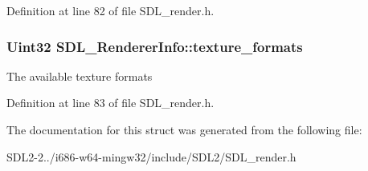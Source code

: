 Definition at line 82 of file S\+D\+L\+\_\+render.\+h.

\hypertarget{structSDL__RendererInfo_a16b63b945662da26d2280458bb2bfa01}{
\subsubsection[{texture\+\_\+formats}]{\setlength{\rightskip}{0pt plus 5cm}Uint32 S\+D\+L\+\_\+\+Renderer\+Info\+::texture\+\_\+formats}}\label{structSDL__RendererInfo_a16b63b945662da26d2280458bb2bfa01}
The available texture formats 

Definition at line 83 of file S\+D\+L\+\_\+render.\+h.



The documentation for this struct was generated from the following file\+:\begin{DoxyCompactItemize}
\item 
S\+D\+L2-\/2../i686-\/w64-\/mingw32/include/\+S\+D\+L2/S\+D\+L\+\_\+render.\+h\end{DoxyCompactItemize}

